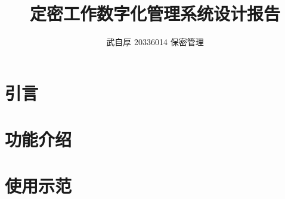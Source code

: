 \documentclass{mystyle}
\title{\textbf{定密工作数字化管理系统设计报告}}
\author{武自厚 \hspace{1em} 20336014 \hspace{1em} 保密管理}
\date{}
\begin{document}
    \maketitle

    \section{引言}  
    
    \section{功能介绍}
    
    \section{使用示范}
    
    
\end{document}
